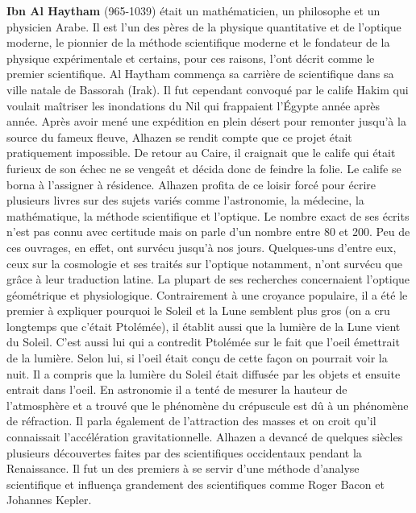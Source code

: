 {}
\label{sec:I}

\textbf{Ibn Al Haytham} (965-1039) était un mathématicien, un philosophe et un physicien Arabe. Il est l'un des pères de la physique quantitative et de l'optique moderne, le pionnier de la méthode scientifique moderne et le fondateur de la physique expérimentale et certains, pour ces raisons, l'ont décrit comme le premier scientifique. Al Haytham commença sa carrière de scientifique dans sa ville natale de Bassorah (Irak). Il fut cependant convoqué par le calife Hakim qui voulait maîtriser les inondations du Nil qui frappaient l'Égypte année après année. Après avoir mené une expédition en plein désert pour remonter jusqu'à la source du fameux fleuve, Alhazen se rendit compte que ce projet était pratiquement impossible. De retour au Caire, il craignait que le calife qui était furieux de son échec ne se vengeât et décida donc de feindre la folie. Le calife se borna à l'assigner à résidence. Alhazen profita de ce loisir forcé pour écrire plusieurs livres sur des sujets variés comme l'astronomie, la médecine, la mathématique, la méthode scientifique et l'optique. Le nombre exact de ses écrits n'est pas connu avec certitude mais on parle d'un nombre entre 80 et 200. Peu de ces ouvrages, en effet, ont survécu jusqu'à nos jours. Quelques-uns d'entre eux, ceux sur la cosmologie et ses traités sur l'optique notamment, n'ont survécu que grâce à leur traduction latine. La plupart de ses recherches concernaient l'optique géométrique et physiologique. Contrairement à une croyance populaire, il a été le premier à expliquer pourquoi le Soleil et la Lune semblent plus gros (on a cru longtemps que c'était Ptolémée), il établit aussi que la lumière de la Lune vient du Soleil. C'est aussi lui qui a contredit Ptolémée sur le fait que l'oeil émettrait de la lumière. Selon lui, si l'oeil était conçu de cette façon on pourrait voir la nuit. Il a compris que la lumière du Soleil était diffusée par les objets et ensuite entrait dans l'oeil. En astronomie il a tenté de mesurer la hauteur de l'atmosphère et a trouvé que le phénomène du crépuscule est dû à un phénomène de réfraction. Il parla également de l'attraction des masses et on croit qu'il connaissait l'accélération gravitationnelle. Alhazen a devancé de quelques siècles plusieurs découvertes faites par des scientifiques occidentaux pendant la Renaissance. Il fut un des premiers à se servir d'une méthode d'analyse scientifique et influença grandement des scientifiques comme Roger Bacon et Johannes Kepler.

